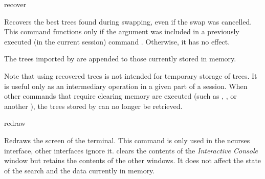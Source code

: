 \begin{command}{recover}{}
    \syntax{\obligatory{()}}

    \begin{poydescription}
            Recovers the best trees found during swapping, even if the swap was
            cancelled. This command functions only if the argument  
            was included in a previously executed 
            (in the current \poy session) command . Otherwise, it has no effect.
	
	The trees imported by  are appended to those currently
	stored in memory.
	
	Note that using recovered trees is not intended for temporary storage of trees.
	It is useful only as an intermediary operation in a given part of a \poy session. When
	other commands that require clearing memory are executed (such as
	, , or another
	),
	the trees stored by  can no longer be retrieved.
            
    \end{poydescription}

    \begin{poyexamples}
    \end{poyexamples}

    \begin{poyalso}
    \end{poyalso}
\end{command}

\begin{command}{redraw}{}

	\syntax{\obligatory{()}}

	\begin{poydescription}
        Redraws the screen of the terminal. This command is only used in the ncurses
        interface, other interfaces ignore it.  clears the
        contents of the \emph{Interactive Console} window but retains the contents
        of the other windows. It does not affect the state of the search and the data
        currently in memory.
	\end{poydescription}

    \begin{poyexamples}
    \end{poyexamples}

\end{command}

